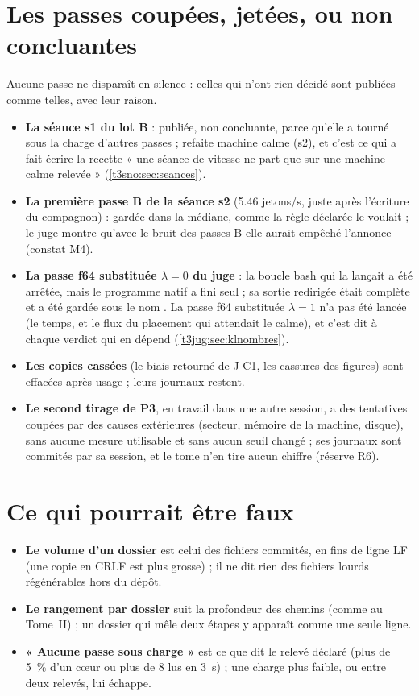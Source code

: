 \section{Les passes coupées, jetées, ou non concluantes}\label{t3ann:sec:coupees}

Aucune passe ne disparaît en silence : celles qui n'ont rien décidé sont publiées comme telles, avec leur raison.
\begin{itemize}
\item \textbf{La séance s1 du lot B} : publiée, non concluante, parce qu'elle a tourné sous la charge d'autres passes ; refaite machine calme (s2), et c'est ce qui a fait écrire la recette « une séance de vitesse ne part que sur une machine calme relevée » (\cref{t3sno:sec:seances}).
\item \textbf{La première passe B de la séance s2} (\num{5.46} jetons/s, juste après l'écriture du compagnon) : gardée dans la médiane, comme la règle déclarée le voulait ; le juge montre qu'avec le bruit des passes B elle aurait empêché l'annonce (constat M4).
\item \textbf{La passe f64 substituée $\lambda = 0$ du juge} : la boucle bash qui la lançait a été arrêtée, mais le programme natif a fini seul ; sa sortie redirigée était complète et a été gardée sous le nom . La passe f64 substituée $\lambda = 1$ n'a pas été lancée (le temps, et le flux du placement qui attendait le calme), et c'est dit à chaque verdict qui en dépend (\cref{t3jug:sec:klnombres}).
\item \textbf{Les copies cassées} (le biais retourné de J-C1, les cassures des figures) sont effacées après usage ; leurs journaux restent.
\item \textbf{Le second tirage de P3}, en travail dans une autre session, a des tentatives coupées par des causes extérieures (secteur, mémoire de la machine, disque), sans aucune mesure utilisable et sans aucun seuil changé ; ses journaux sont commités par sa session, et le tome n'en tire aucun chiffre (réserve R6).
\end{itemize}

\section*{Ce qui pourrait être faux}

\begin{faux}
\begin{itemize}
\item \textbf{Le volume d'un dossier} est celui des fichiers commités, en fins de ligne LF (une copie en CRLF est plus grosse) ; il ne dit rien des fichiers lourds régénérables hors du dépôt.
\item \textbf{Le rangement par dossier} suit la profondeur des chemins (comme au Tome~II) ; un dossier qui mêle deux étapes y apparaît comme une seule ligne.
\item \textbf{« Aucune passe sous charge »} est ce que dit le relevé déclaré (plus de \SI{5}{\percent} d'un cœur ou plus de \SI{8}{\Mo} lus en \SI{3}{\second}) ; une charge plus faible, ou entre deux relevés, lui échappe.
\end{itemize}
\end{faux}
